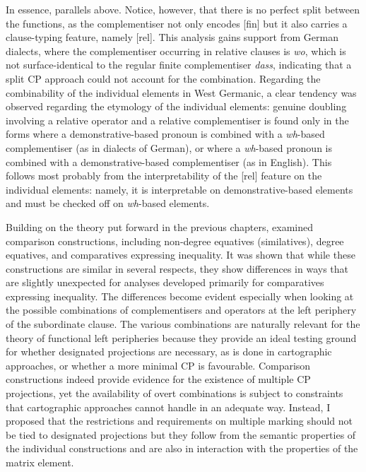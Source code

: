 In essence,  parallels  above. Notice, however, that there is no perfect split between the functions, as the complementiser not only encodes [fin] but it also carries a clause-typing feature, namely [rel]. This analysis gains support from German dialects, where the complementiser occurring in relative clauses is \textit{wo}, which is not surface-identical to the regular finite complementiser \textit{dass}, indicating that a split CP approach could not account for the combination. Regarding the combinability of the individual elements in West Germanic, a clear tendency was observed regarding the etymology of the individual elements: genuine doubling involving a relative operator and a relative complementiser is found only in the forms where a demonstrative-based pronoun is combined with a \textit{wh}-based complementiser (as in dialects of German), or where a \textit{wh}-based pronoun is combined with a demonstrative-based complementiser (as in English). This follows most probably from the interpretability of the [rel] feature on the individual elements: namely, it is interpretable on demonstrative-based elements and must be checked off on \textit{wh}-based elements.

Building on the theory put forward in the previous chapters,  examined comparison constructions, including non-degree equatives (similatives), degree equatives, and comparatives expressing inequality. It was shown that while these constructions are similar in several respects, they show differences in ways that are slightly unexpected for analyses developed primarily for comparatives expressing inequality. The differences become evident especially when looking at the possible combinations of complementisers and operators at the left periphery of the subordinate clause. The various combinations are naturally relevant for the theory of functional left peripheries because they provide an ideal testing ground for whether designated projections are necessary, as is done in cartographic approaches, or whether a more minimal CP is favourable. Comparison constructions indeed provide evidence for the existence of multiple CP projections, yet the availability of overt combinations is subject to constraints that cartographic approaches cannot handle in an adequate way. Instead, I proposed that the restrictions and requirements on multiple marking should not be tied to designated projections but they follow from the semantic properties of the individual constructions and are also in interaction with the properties of the matrix element.\largerpage

